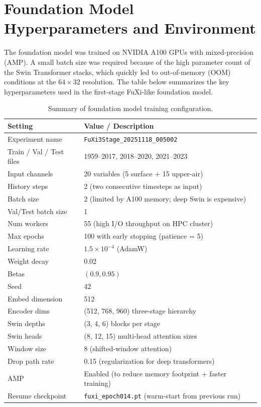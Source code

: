 \documentclass[12pt]{report}
\begin{document}
\section{Foundation Model Hyperparameters and Environment}

The foundation model was trained on NVIDIA A100 GPUs with mixed-precision (AMP). 
A small batch size was required because of the high parameter count of the Swin Transformer stacks, which quickly led to out-of-memory (OOM) conditions at the $64\times32$ resolution. 
The table below summarizes the key hyperparameters used in the first-stage FuXi-like foundation model.

\begin{table}[H]
\centering
\caption{Summary of foundation model training configuration.}
\begin{tabular}{ll}
\hline
\textbf{Setting} & \textbf{Value / Description} \\
\hline
Experiment name & \texttt{FuXi3Stage\_20251118\_005002} \\
Train / Val / Test files & 1959--2017, 2018--2020, 2021--2023 \\
Input channels & 20 variables (5 surface + 15 upper-air) \\
History steps & 2 (two consecutive timesteps as input) \\
Batch size & 2 (limited by A100 memory; deep Swin is expensive) \\
Val/Test batch size & 1 \\
Num workers & 55 (high I/O throughput on HPC cluster) \\
Max epochs & 100 with early stopping (patience = 5) \\
Learning rate & $1.5\times10^{-4}$ (AdamW) \\
Weight decay & 0.02 \\
Betas & $(0.9, 0.95)$ \\
Seed & 42 \\
Embed dimension & 512 \\
Encoder dims & (512, 768, 960) three-stage hierarchy \\
Swin depths & (3, 4, 6) blocks per stage \\
Swin heads & (8, 12, 15) multi-head attention sizes \\
Window size & 8 (shifted-window attention) \\
Drop path rate & 0.15 (regularization for deep transformers) \\
AMP & Enabled (to reduce memory footprint + faster training) \\
Resume checkpoint &
\texttt{fuxi\_epoch014.pt} (warm-start from previous run) \\
\hline
\end{tabular}
\end{table}
\end{document}
